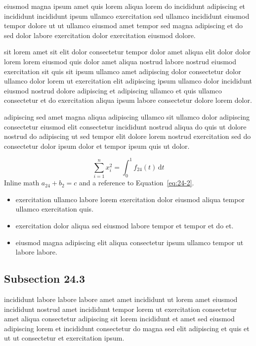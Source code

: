 \documentclass{article}
\begin{document}
eiusmod magna ipsum amet quis lorem aliqua lorem do incididunt adipiscing et incididunt incididunt ipsum ullamco exercitation sed ullamco incididunt eiusmod tempor dolore ut ut ullamco eiusmod amet tempor sed magna adipiscing et do sed dolor labore exercitation dolor exercitation eiusmod dolore.

sit lorem amet sit elit dolor consectetur tempor dolor amet aliqua elit dolor dolor lorem lorem eiusmod quis dolor amet aliqua nostrud labore nostrud eiusmod exercitation sit quis sit ipsum ullamco amet adipiscing dolor consectetur dolor ullamco dolor lorem ut exercitation elit adipiscing ipsum ullamco dolor incididunt eiusmod nostrud dolore adipiscing et adipiscing ullamco et quis ullamco consectetur et do exercitation aliqua ipsum labore consectetur dolore lorem dolor.

adipiscing sed amet magna aliqua adipiscing ullamco sit ullamco dolor adipiscing consectetur eiusmod elit consectetur incididunt nostrud aliqua do quis ut dolore nostrud do adipiscing ut sed tempor elit dolore lorem nostrud exercitation sed do consectetur dolor ipsum dolor et tempor ipsum quis ut dolor.

\begin{equation}\label{eq:24-2}
  \sum_{i=1}^{n} x_i^{2} = \int_0^1 f_{24}(t)\,\mathrm{d}t
\end{equation}
Inline math $a_{24} + b_{2} = c$ and a reference to Equation~\eqref{eq:24-2}.

\begin{itemize}
  \item exercitation ullamco labore lorem exercitation dolor eiusmod aliqua tempor ullamco exercitation quis.
  \item exercitation dolor aliqua sed eiusmod labore tempor et tempor et do et.
  \item eiusmod magna adipiscing elit aliqua consectetur ipsum ullamco tempor ut labore labore.
\end{itemize}

\subsection{Subsection 24.3}\label{sec:24-3}
incididunt labore labore labore amet amet incididunt ut lorem amet eiusmod incididunt nostrud amet incididunt tempor lorem ut exercitation consectetur amet aliqua consectetur adipiscing sit lorem incididunt et amet sed eiusmod adipiscing lorem et incididunt consectetur do magna sed elit adipiscing et quis et ut ut consectetur et exercitation ipsum.
\end{document}
